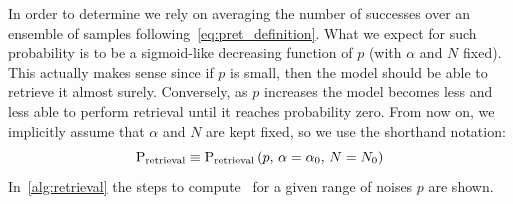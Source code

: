 \documentclass[\rootdir/main.tex]{subfiles}
\begin{document}

In order to determine  we rely on averaging the number of successes over an ensemble of samples following~\cref{eq:pret_definition}. What we expect for such probability is to be a sigmoid-like decreasing function of $p$ (with $\alpha$ and $N$ fixed). This actually makes sense since if $p$ is small, then the model should be able to retrieve it almost surely. Conversely, as $p$ increases the model becomes less and less able to perform retrieval until it reaches probability zero.
From now on, we implicitly assume that $\alpha$ and $N$ are kept fixed, so we use the shorthand notation:
\begin{equation}
     \mathrm{P}_{\text{retrieval}}  \equiv \mathrm{P}_{\text{retrieval}} \left(p, \, \alpha = \alpha_0, \, N = N_0  \right)
\end{equation}
In~\cref{alg:retrieval} the steps to compute \pretshort\ for a given range of noises $p$ are shown.
\end{document}
